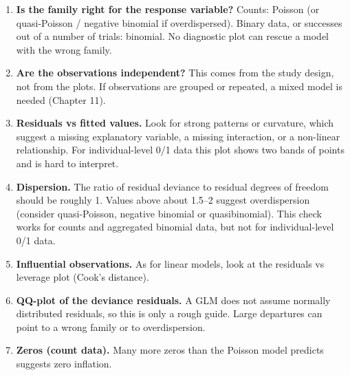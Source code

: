 \documentclass[
  letterpaper,
  8pt,
  a4paper]{book}
\providecommand{\tightlist}{%
  \setlength{\itemsep}{0pt}\setlength{\parskip}{0pt}}
\begin{document}
\begin{tcolorbox}[enhanced jigsaw, arc=.35mm, bottomrule=.15mm, bottomtitle=1mm, breakable, colback=white, colbacktitle=quarto-callout-note-color!10!white, colframe=quarto-callout-note-color-frame, coltitle=black, left=2mm, leftrule=.75mm, opacityback=0, opacitybacktitle=0.6, rightrule=.15mm, title=\textcolor{quarto-callout-note-color}{\faInfo}\hspace{0.5em}{Checklist: checking a GLM}, titlerule=0mm, toprule=.15mm, toptitle=1mm]

\begin{enumerate}
\def\labelenumi{\arabic{enumi}.}
\tightlist
\item
  \textbf{Is the family right for the response variable?} Counts:
  Poisson (or quasi-Poisson / negative binomial if overdispersed).
  Binary data, or successes out of a number of trials: binomial. No
  diagnostic plot can rescue a model with the wrong family.
\item
  \textbf{Are the observations independent?} This comes from the study
  design, not from the plots. If observations are grouped or repeated, a
  mixed model is needed (Chapter 11).
\item
  \textbf{Residuals vs fitted values.} Look for strong patterns or
  curvature, which suggest a missing explanatory variable, a missing
  interaction, or a non-linear relationship. For individual-level 0/1
  data this plot shows two bands of points and is hard to interpret.
\item
  \textbf{Dispersion.} The ratio of residual deviance to residual
  degrees of freedom should be roughly 1. Values above about 1.5--2
  suggest overdispersion (consider quasi-Poisson, negative binomial or
  quasibinomial). This check works for counts and aggregated binomial
  data, but not for individual-level 0/1 data.
\item
  \textbf{Influential observations.} As for linear models, look at the
  residuals vs leverage plot (Cook's distance).
\item
  \textbf{QQ-plot of the deviance residuals.} A GLM does not assume
  normally distributed residuals, so this is only a rough guide. Large
  departures can point to a wrong family or to overdispersion.
\item
  \textbf{Zeros (count data).} Many more zeros than the Poisson model
  predicts suggests zero inflation.
\end{enumerate}

\end{tcolorbox}
\end{document}
